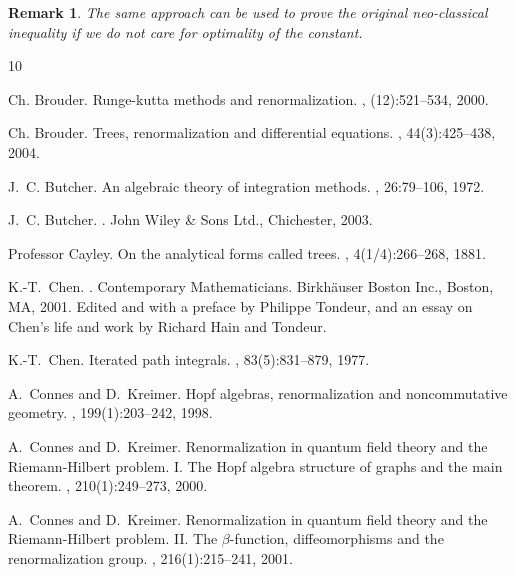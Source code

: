 \documentclass[a4paper,11pt,reqno]{article}
\newcommand{\1}{{\bf 1}}
\newtheorem{remark}[theorem]{Remark}
\begin{document}
\begin{remark}
The same approach can be used to prove the original neo-classical inequality if we do not care for  optimality of the  constant.
\end{remark}


\begin{thebibliography}{10}

Ch. Brouder.
\newblock Runge-kutta methods and renormalization.
, (12):521--534, 2000.

Ch. Brouder.
\newblock Trees, renormalization and differential equations.
, 44(3):425--438, 2004.

J.~C. Butcher.
\newblock An algebraic theory of integration methods.
, 26:79--106, 1972.

J.~C. Butcher.
.
\newblock John Wiley \& Sons Ltd., Chichester, 2003.

Professor Cayley.
\newblock On the analytical forms called trees.
, 4(1/4):266--268, 1881.

K.-T.~Chen.
.
\newblock Contemporary Mathematicians. Birkh\"auser Boston Inc., Boston, MA,
  2001.
\newblock Edited and with a preface by Philippe Tondeur, and an essay on Chen's
  life and work by Richard Hain and Tondeur.

K.-T.~Chen.
\newblock Iterated path integrals.
, 83(5):831--879, 1977.

A.~Connes and D.~Kreimer.
\newblock Hopf algebras, renormalization and noncommutative geometry.
, 199(1):203--242, 1998.

A.~Connes and D.~Kreimer.
\newblock Renormalization in quantum field theory and the {R}iemann-{H}ilbert
  problem. {I}. {T}he {H}opf algebra structure of graphs and the main theorem.
, 210(1):249--273, 2000.

A.~Connes and D.~Kreimer.
\newblock Renormalization in quantum field theory and the {R}iemann-{H}ilbert
  problem. {II}. {T}he {$\beta$}-function, diffeomorphisms and the
  renormalization group.
, 216(1):215--241, 2001.


\end{thebibliography}
\end{document}
